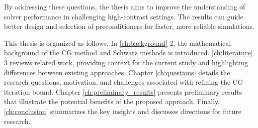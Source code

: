 By addressing these questions, the thesis aims to improve the understanding of solver performance in challenging high-contrast settings. The results can guide better design and selection of preconditioners for faster, more reliable simulations.

This thesis is organized as follows. In \cref{ch:background} 2, the mathematical background of the CG method and Schwarz methods is introduced. \cref{ch:literature} 3 reviews related work, providing context for the current study and highlighting differences between existing approaches. Chapter \ref{ch:questions} details the research questions, motivation, and challenges associated with refining the CG iteration bound. Chapter \ref{ch:preliminary_results} presents preliminary results that illustrate the potential benefits of the proposed approach. Finally, \cref{ch:conclusion} summarizes the key insights and discusses directions for future research.